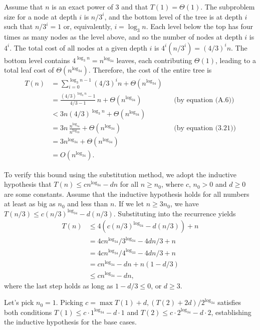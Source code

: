\subexercise
Assume that $n$ is an exact power of 3 and that $T(1)=\Theta(1)$.
The subproblem size for a node at depth $i$ is $n/3^i$, and the bottom level of the tree is at depth $i$ such that $n/3^i=1$ or, equivalently, $i=\log_3n$.
Each level below the top has four times as many nodes as the level above, and so the number of nodes at depth $i$ is $4^i$.
The total cost of all nodes at a given depth $i$ is $4^i(n/3^i)=(4/3)^in$.
The bottom level contains $4^{\log_3n}=n^{\log_34}$ leaves, each contributing $\Theta(1)$, leading to a total leaf cost of $\Theta(n^{\log_34})$.
Therefore, the cost of the entire tree is
\begin{align*}
    T(n) &= \sum_{i=0}^{\log_3n-1}(4/3)^in+\Theta(n^{\log_34}) \\[1mm]
    &= \frac{(4/3)^{\log_3n}-1}{4/3-1}\,n+\Theta(n^{\log_34}) && \text{(by equation (A.6))} \\[1mm]
    &< 3n(4/3)^{\log_3n}+\Theta(n^{\log_34}) \\[1mm]
    &= 3n\,\frac{n^{\log_34}}{n^{\log_33}}+\Theta(n^{\log_34}) && \text{(by equation (3.21))} \\[2mm]
    &= 3n^{\log_34}+\Theta(n^{\log_34}) \\
    &= O(n^{\log_34}).
\end{align*}

To verify this bound using the substitution method, we adopt the inductive hypothesis that $T(n)\le cn^{\log_34}-dn$ for all $n\ge n_0$, where $c$, $n_0>0$ and $d\ge0$ are some constants.
Assume that the inductive hypothesis holds for all numbers at least as big as $n_0$ and less than $n$.
If we let $n\ge3n_0$, we have $T(n/3)\le c(n/3)^{\log_34}-d(n/3)$.
Substituting into the recurrence yields
\begin{align*}
    T(n) &\le 4\left(c(n/3)^{\log_34}-d(n/3)\right)+n \\
    &= 4cn^{\log_34}\!/3^{\log_34}-4dn/3+n \\
    &= 4cn^{\log_34}\!/4^{\log_33}-4dn/3+n \\
    &= cn^{\log_34}-dn+n(1-d/3) \\
    &\le cn^{\log_34}-dn,
\end{align*}
where the last step holds as long as $1-d/3\le0$, or $d\ge3$.

Let's pick $n_0=1$.
Picking $c=\max{T(1)+d,(T(2)+2d)/2^{\log_34}}$ satisfies both conditions $T(1)\le c\cdot1^{\log_34}-d\cdot1$ and $T(2)\le c\cdot2^{\log_34}-d\cdot2$, establishing the inductive hypothesis for the base cases.

